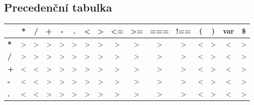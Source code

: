 \documentclass[11pt,a4paper]{article}
\renewcommand{\familydefault}{\sfdefault}
\begin{document}
    \subsection{Precedenční tabulka}
    \renewcommand{\familydefault}{\ttdefault}

    \begin{table}[h!]
        \begin{tabular}{|l|c|c|c|c|c|c|c|c|c|c|c|c|c|c|c|}
        \hline
                                 & \textbf{*}     & \textbf{/}     & \textbf{+}     & \textbf{-}     & \textbf{.}     & \textbf{\textless{}} & \textbf{\textgreater{}} & \textbf{\textless{}=} & \textbf{\textgreater{}=} & \textbf{===}   & \textbf{!==}   & \textbf{(}  & \textbf{)}     & \textbf{var} & \textbf{\$}    \\ \hline
        \textbf{*}               & \textgreater{} & \textgreater{} & \textgreater{} & \textgreater{} & \textgreater{} & \textgreater{}       & \textgreater{}          & \textgreater{}        & \textgreater{}           & \textgreater{} & \textgreater{} & \textless{} & \textgreater{} & \textless{}  & \textgreater{} \\ \hline
        \textbf{/}               & \textgreater{} & \textgreater{} & \textgreater{} & \textgreater{} & \textgreater{} & \textgreater{}       & \textgreater{}          & \textgreater{}        & \textgreater{}           & \textgreater{} & \textgreater{} & \textless{} & \textgreater{} & \textless{}  & \textgreater{} \\ \hline
        \textbf{+}               & \textless{}    & \textless{}    & \textgreater{} & \textgreater{} & \textgreater{} & \textgreater{}       & \textgreater{}          & \textgreater{}        & \textgreater{}           & \textgreater{} & \textgreater{} & \textless{} & \textgreater{} & \textless{}  & \textgreater{} \\ \hline
        \textbf{-}               & \textless{}    & \textless{}    & \textgreater{} & \textgreater{} & \textgreater{} & \textgreater{}       & \textgreater{}          & \textgreater{}        & \textgreater{}           & \textgreater{} & \textgreater{} & \textless{} & \textgreater{} & \textless{}  & \textgreater{} \\ \hline
        \textbf{.}               & \textless{}    & \textless{}    & \textgreater{} & \textgreater{} & \textgreater{} & \textgreater{}       & \textgreater{}          & \textgreater{}        & \textgreater{}           & \textgreater{} & \textgreater{} & \textless{} & \textgreater{} & \textless{}  & \textgreater{} \\ \hline

\end{tabular}
\end{table}
\end{document}
